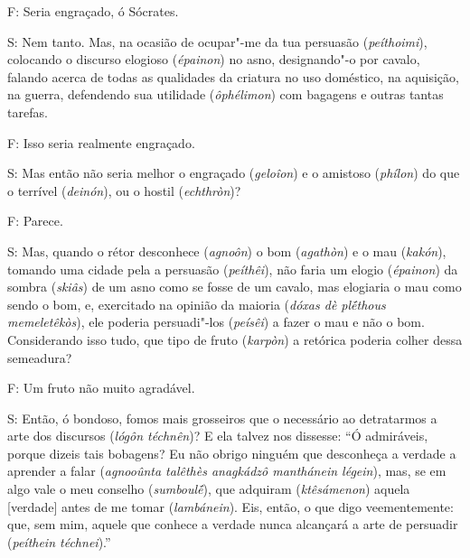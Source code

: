 F: Seria engraçado, ó Sócrates.

S: Nem tanto. Mas, na ocasião de ocupar"-me da tua persuasão
(\emph{peíthoimi}), colocando o discurso elogioso (\emph{épainon}) no
asno, designando"-o por cavalo, falando acerca de todas as qualidades da
criatura no uso doméstico, na aquisição, na guerra, defendendo sua
utilidade (\emph{ôphélimon}) com bagagens e outras tantas tarefas.

\bekker{[260c]} F: Isso seria realmente engraçado.

S: Mas então não seria melhor o engraçado (\emph{geloîon}) e o amistoso
(\emph{phílon}) do que o terrível (\emph{deinón}), ou o hostil
(\emph{echthròn})?

F: Parece.

S: Mas, quando o rétor desconhece (\emph{agnoôn}) o bom (\emph{agathòn})
e o mau (\emph{kakón}), tomando uma cidade pela a persuasão
(\emph{peíthêi}), não faria um elogio (\emph{épainon}) da sombra
(\emph{skiâs}) de um asno como se fosse de um cavalo, mas elogiaria o
mau como sendo o bom, e, exercitado na opinião da maioria (\emph{dóxas
dè plḗthous memeletêkòs}), ele poderia persuadi"-los (\emph{peísêi}) a
fazer o mau e não o bom. Considerando isso tudo, que tipo de fruto
(\emph{karpòn}) a retórica poderia colher dessa semeadura?

F: Um fruto não muito agradável.

S: Então, ó bondoso, fomos mais grosseiros que o necessário ao
detratarmos a arte dos discursos (\emph{lógôn téchnên})? E ela talvez
nos dissesse: ``Ó admiráveis, porque dizeis tais bobagens? Eu não obrigo
ninguém que desconheça a verdade a aprender a falar (\emph{agnooûnta
talêthès anagkádzô manthánein légein}), mas, se em algo vale o meu
conselho (\emph{sumboulḗ}), que adquiram (\emph{ktêsámenon}) aquela
[verdade] antes de me tomar (\emph{lambánein}). Eis, então, o que digo
veementemente: que, sem mim, aquele que conhece a verdade nunca
alcançará a arte de persuadir (\emph{peíthein téchnei}).''

